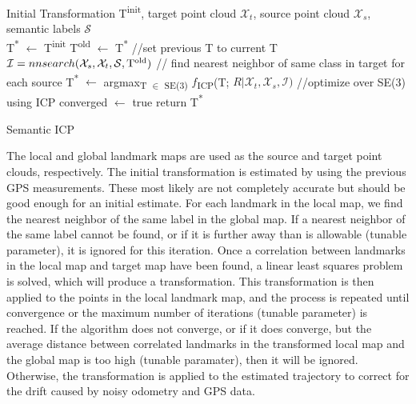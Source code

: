 \documentclass[letterpaper, 10 pt, conference]{ieeeconf}  %
\begin{document}
\begin{algorithm}[ht]
\label{alg:sicpse3}
\begin{algorithmic}[1]
\Require  Initial Transformation T\textsuperscript{init}, target point cloud $\mathcal{X}_t$, source point cloud $\mathcal{X}_s$, semantic labels $\mathcal{S}$\\
T\textsuperscript{*} $\leftarrow$ T\textsuperscript{init}
		\State T\textsuperscript{old} $\leftarrow$ T\textsuperscript{*} //set previous T to current T
		\State $\mathcal{I} = nnsearch{(\mathcal{X}_s, \mathcal{X}_t, \mathcal{S},  \mathrm{T\textsuperscript{old})}}$ // find nearest neighbor of same class in target for each source
		\State T\textsuperscript{*} $\leftarrow$ argmax\textsubscript{T $\in$ SE(3)} $f$\textsubscript{ICP}(T; $R|\mathcal{X}_t, \mathcal{X}_s, \mathcal{I})$ //optimize over SE(3) using ICP
			\State converged $\leftarrow$ true	
		\EndIf
	\EndWhile
	\State return T\textsuperscript{*}
\caption{Semantic ICP}
\end{algorithmic}
\end{algorithm}

The local and global landmark maps are used as the source and target point clouds, respectively. The initial transformation is estimated by using the previous GPS measurements. These most likely are not completely accurate but should be good enough for an initial estimate. For each landmark in the local map, we find the nearest neighbor \cite{cNN} of the same label in the global map. If a nearest neighbor of the same label cannot be found, or if it is further away than is allowable (tunable parameter), it is ignored for this iteration. Once a correlation between landmarks in the local map and target map have been found, a linear least squares problem is solved, which will produce a transformation. This transformation is then applied to the points in the local landmark map, and the process is repeated until convergence or the maximum number of iterations (tunable parameter) is reached. If the algorithm does not converge, or if it does converge, but the average distance between correlated landmarks in the transformed local map and the global map is too high (tunable paramater), then it will be ignored. Otherwise, the transformation is applied to the estimated trajectory to correct for the drift caused by noisy odometry and GPS data.
\end{document}
